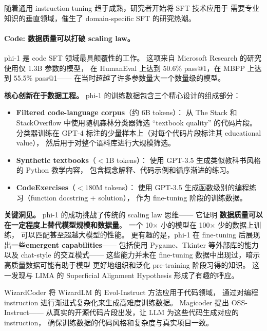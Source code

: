 随着通用 instruction tuning 趋于成熟，研究者开始将 SFT 技术应用于
需要专业知识的垂直领域，催生了 domain-specific SFT 的研究热潮。

\paragraph{Code: 数据质量可以打破 scaling law。}
phi-1 是 code SFT 领域最具颠覆性的工作。
这项来自 Microsoft Research 的研究使用仅 1.3B 参数的模型，
在 HumanEval 上达到 50.6\% pass@1，在 MBPP 上达到 55.5\% pass@1——
在当时超越了许多参数量大一个数量级的模型。

\textbf{核心创新在于数据工程。}
phi-1 的训练数据包含三个精心设计的组成部分：
\begin{itemize}[leftmargin=1.5em]
  \item \textbf{Filtered code-language corpus}（约 6B tokens）：
    从 The Stack 和 StackOverflow 中使用随机森林分类器筛选
    ``textbook quality'' 的代码片段。
    分类器训练在 GPT-4 标注的少量样本上（对每个代码片段标注其 educational value），
    然后用于对整个语料库进行大规模筛选。

  \item \textbf{Synthetic textbooks}（$< 1$B tokens）：
    使用 GPT-3.5 生成类似教科书风格的 Python 教学内容，
    包含概念解释、代码示例和循序渐进的练习。

  \item \textbf{CodeExercises}（$< 180$M tokens）：
    使用 GPT-3.5 生成函数级别的编程练习（function docstring + solution），
    作为 fine-tuning 阶段的训练数据。
\end{itemize}

\textbf{关键洞见。}
phi-1 的成功挑战了传统的 scaling law 思维——
它证明 \textbf{数据质量可以在一定程度上替代模型规模和数据量}。
一个 10$\times$ 小的模型在 100$\times$ 少的数据上训练，
可以匹配甚至超越大模型的性能。
更有趣的是，phi-1 在 fine-tuning 后展现出一些\textbf{emergent capabilities}——
包括使用 Pygame、Tkinter 等外部库的能力以及 chat-style 的交互模式——
这些能力并未在 fine-tuning 数据中出现过，暗示高质量数据可能有助于模型
更好地组织和泛化 pre-training 阶段习得的知识。
这一发现与 LIMA 的 Superficial Alignment Hypothesis 形成了有趣的呼应。

WizardCoder \citep{luo2023wizardcoder} 将 WizardLM 的 Evol-Instruct 方法应用于代码领域，
通过对编程 instruction 进行渐进式复杂化来生成高难度训练数据。
Magicoder \citep{wei2023magicoder} 提出 OSS-Instruct——
从真实的开源代码片段出发，让 LLM 为这些代码生成对应的 instruction，
确保训练数据的代码风格和复杂度与真实项目一致。

